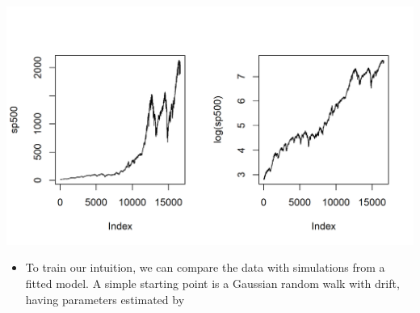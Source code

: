 \documentclass[]{article}
\providecommand{\tightlist}{%
  \setlength{\itemsep}{0pt}\setlength{\parskip}{0pt}}
\begin{document}
\includegraphics{figure/intro-sp500-1.png}

\begin{itemize}
\tightlist
\item
  To train our intuition, we can compare the data with simulations from
  a fitted model. A simple starting point is a Gaussian random walk with
  drift, having parameters estimated by
\end{itemize}
\end{document}
